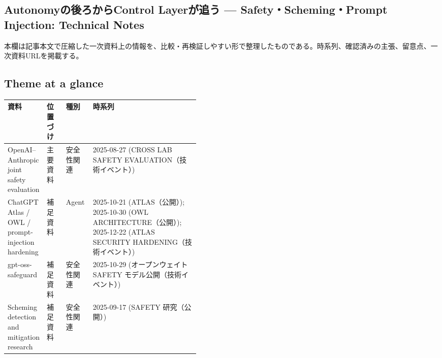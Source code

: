 \subsection*{Autonomyの後ろからControl Layerが追う — Safety・Scheming・Prompt Injection: Technical Notes}
本欄は記事本文で圧縮した一次資料上の情報を、比較・再検証しやすい形で整理したものである。時系列、確認済みの主張、留意点、一次資料URLを掲載する。
\medskip
\subsection*{Theme at a glance}
\begin{center}
\footnotesize
\begin{tabularx}{\linewidth}{@{}p{0.20\linewidth}p{0.10\linewidth}p{0.14\linewidth}X@{}}
\toprule
資料 & 位置づけ & 種別 & 時系列 \\
\midrule
OpenAI–Anthropic joint safety evaluation & 主要資料 & 安全性関連 & 2025-08-27 (CROSS LAB SAFETY EVALUATION（技術イベント）)  \\
ChatGPT Atlas / OWL / prompt-injection hardening & 補足資料 & Agent & 2025-10-21 (ATLAS（公開）); 2025-10-30 (OWL ARCHITECTURE（公開）); 2025-12-22 (ATLAS SECURITY HARDENING（技術イベント）)  \\
gpt-oss-safeguard & 補足資料 & 安全性関連 & 2025-10-29 (オープンウェイト SAFETY モデル公開（技術イベント）)  \\
Scheming detection and mitigation research & 補足資料 & 安全性関連 & 2025-09-17 (SAFETY 研究（公開）)  \\
\bottomrule
\end{tabularx}
\end{center}
\normalsize

